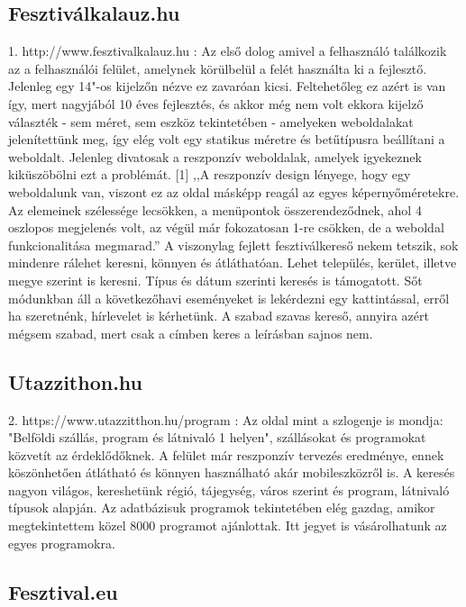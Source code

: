 \subsection{Fesztiválkalauz.hu}

1. http://www.fesztivalkalauz.hu : Az első dolog amivel a felhasználó találkozik az a felhasználói felület, amelynek körülbelül a felét használta ki a fejlesztő. Jelenleg egy 14"-os kijelzőn nézve ez zavaróan kicsi. Feltehetőleg ez azért is van így, mert nagyjából 10 éves fejlesztés, és akkor még nem volt ekkora kijelző választék - sem méret, sem eszköz tekintetében - amelyeken weboldalakat jelenítettünk meg, így elég volt egy statikus méretre és betűtípusra beállítani a weboldalt. Jelenleg divatosak a reszponzív weboldalak, amelyek igyekeznek kiküszöbölni ezt a problémát.
[1] ,,A reszponzív design lényege, hogy egy weboldalunk van, viszont ez az oldal másképp reagál az egyes képernyőméretekre. Az elemeinek szélessége lecsökken, a menüpontok összerendeződnek, ahol 4 oszlopos megjelenés volt, az végül már fokozatosan 1-re csökken, de a weboldal funkcionalitása megmarad.''
A viszonylag fejlett fesztiválkereső nekem tetszik, sok mindenre rálehet keresni, könnyen és átláthatóan.
Lehet település, kerület, illetve megye szerint is keresni. Típus és dátum szerinti keresés is támogatott. Sőt módunkban áll a következőhavi eseményeket is lekérdezni egy kattintással, erről ha szeretnénk, hírlevelet is kérhetünk. A szabad szavas kereső, annyira azért mégsem szabad, mert csak a címben keres a leírásban sajnos nem.

\subsection{Utazzithon.hu}

2. https://www.utazzitthon.hu/program : Az oldal mint a szlogenje is mondja: "Belföldi szállás, program és látnivaló 1 helyen", szállásokat és programokat közvetít az érdeklődőknek. A felület már reszponzív tervezés eredménye, ennek köszönhetően átlátható és könnyen használható akár mobileszközről is. A keresés nagyon világos, kereshetünk régió, tájegység, város szerint és program, látnivaló típusok alapján. Az adatbázisuk programok tekintetében elég gazdag, amikor megtekintettem közel 8000 programot ajánlottak. Itt jegyet is vásárolhatunk az egyes programokra.

\subsection{Fesztival.eu}

